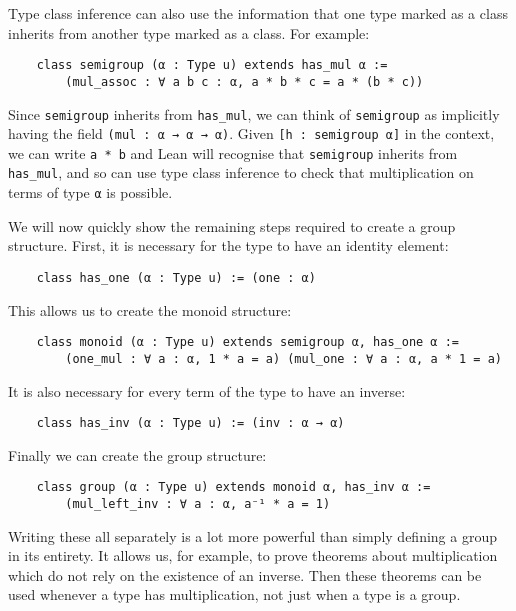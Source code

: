 \documentclass[runningheads,a4paper]{llncs}
\renewcommand{\-}{\setminus}
\begin{document}
Type class inference can also use the information that one type marked as a class inherits from another type marked as a class. For example:

\begin{lstlisting}
    class semigroup (α : Type u) extends has_mul α :=
        (mul_assoc : ∀ a b c : α, a * b * c = a * (b * c))
\end{lstlisting}

Since \lstinline{semigroup} inherits from \lstinline{has_mul}, we can think of \lstinline{semigroup} as implicitly having the field \lstinline{(mul : α → α → α)}. Given \lstinline{[h : semigroup α]} in the context, we can write \lstinline{a * b} and Lean will recognise that \lstinline{semigroup} inherits from \lstinline{has_mul}, and so can use type class inference to check that multiplication on terms of type \lstinline{α} is possible.

We will now quickly show the remaining steps required to create a group structure. First, it is necessary for the type to have an identity element:

\begin{lstlisting}
    class has_one (α : Type u) := (one : α)
\end{lstlisting}

This allows us to create the monoid structure:

\begin{lstlisting}
    class monoid (α : Type u) extends semigroup α, has_one α :=
        (one_mul : ∀ a : α, 1 * a = a) (mul_one : ∀ a : α, a * 1 = a)
\end{lstlisting}

It is also necessary for every term of the type to have an inverse:

\begin{lstlisting}
    class has_inv (α : Type u) := (inv : α → α)
\end{lstlisting}

Finally we can create the group structure:

\begin{lstlisting}
    class group (α : Type u) extends monoid α, has_inv α :=
        (mul_left_inv : ∀ a : α, a⁻¹ * a = 1)
\end{lstlisting}

Writing these all separately is a lot more powerful than simply defining a group in its entirety. It allows us, for example, to prove theorems about multiplication which do not rely on the existence of an inverse. Then these theorems can be used whenever a type has multiplication, not just when a type is a group.
\end{document}
